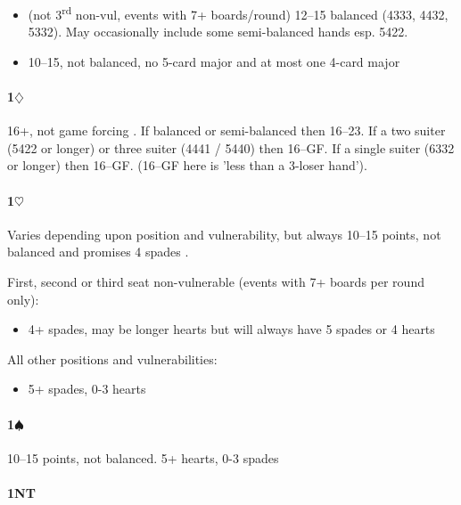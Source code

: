 \documentclass[a4paper,14pt]{extarticle}
\begin{document}
\begin{itemize}
\item (not 3\textsuperscript{rd} non-vul, events with 7+ boards/round) 12--15 balanced (4333, 4432, 5332). May occasionally include some semi-balanced hands esp. 5422.
\item 10--15, not balanced, no 5-card major and at most one 4-card major
\end{itemize}

\paragraph{1$\diamondsuit$}

16+, not game forcing . If balanced or semi-balanced then 16--23. If a two suiter (5422 or longer) or three suiter (4441 / 5440) then 16--GF. If a single suiter (6332 or longer) then 16--GF. (16--GF here is 'less than a 3-loser hand').

\paragraph{1$\heartsuit$}

Varies depending upon position and vulnerability, but always 10--15 points, not
balanced and promises 4 spades .

First, second or third seat non-vulnerable (events with 7+ boards per round only):
\begin{itemize}
\item 4+ spades, may be longer hearts but will always have 5 spades or 4 hearts
\end{itemize}

All other positions and vulnerabilities:
\begin{itemize}
\item 5+ spades, 0-3 hearts
\end{itemize}

\newpage

\paragraph{1$\spadesuit$}

10--15 points, not balanced. 5+ hearts, 0-3 spades 

\paragraph{1NT}
\end{document}

